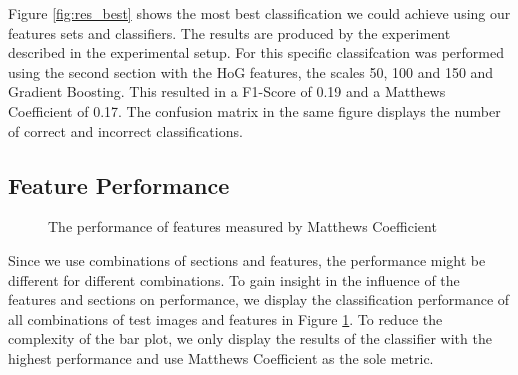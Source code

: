Figure \ref{fig:res_best} shows the most best classification we could achieve using our features sets and classifiers. The results are produced by the experiment described in the experimental setup. For this specific classifcation was performed using the second section with the HoG features, the scales 50, 100 and 150 and Gradient Boosting. This resulted in a F1-Score of 0.19 and a Matthews Coefficient of 0.17. The confusion matrix in the same figure displays the number of correct and incorrect classifications. 

\subsection{Feature Performance}

\datazero

\begin{figure}
	\caption{The performance of features measured by Matthews Coefficient}
	\label{fig:res_bar_0}
\end{figure}


Since we use combinations of sections and features, the performance might be different for different combinations. To gain insight in the influence of the features and sections on performance, we display the classification performance of all combinations of test images and features in Figure \ref{fig:res_bar_0}. To reduce the complexity of the bar plot, we only display the results of the classifier with the highest performance and use Matthews Coefficient as the sole metric.

